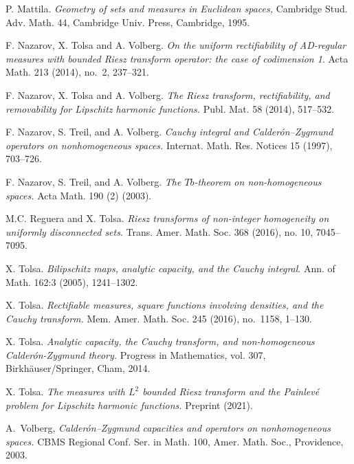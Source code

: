 \documentclass[11pt]{amsart}
\theoremstyle{definition}
\theoremstyle{remark}
\numberwithin{equation}{section}
\begin{document}
\begin{thebibliography}{NTWV}
 P. Mattila. {\em Geometry of sets and measures in
Euclidean spaces,} Cambridge Stud. Adv. Math. 44, Cambridge Univ.
Press, Cambridge, 1995.

 F. Nazarov, X. Tolsa and A. Volberg. \emph{On the uniform
  rectifiability of {AD}-regular measures with bounded {R}iesz transform
  operator: the case of codimension 1}. Acta Math. {213} (2014), no.~2,
  237--321. 

 F. Nazarov, X. Tolsa and A. Volberg. {\em The Riesz transform,
rectifiability, and removability for
 Lipschitz harmonic functions.}
Publ. Mat. 58 (2014), 517--532.

 F. Nazarov, S. Treil, and A. Volberg. {\em Cauchy integral and Calder\'on–Zygmund operators on nonhomogeneous spaces.} Internat. Math. Res. Notices 15 (1997), 703--726.

 F. Nazarov, S. Treil, and A. Volberg. {\em The $Tb$-theorem on non-homogeneous spaces.} Acta Math. 190 (2) (2003).


 M.C. Reguera and X. Tolsa. {\em Riesz transforms of non-integer homogeneity on uniformly disconnected sets}. Trans. Amer. Math. Soc. 368 (2016), no. 10, 7045--7095. 

 X. Tolsa. {\em Bilipschitz maps, analytic
capacity, and the Cauchy integral}. Ann. of Math. 162:3 (2005), 1241--1302.
 
 X. Tolsa. {\em Rectifiable measures, square functions involving densities, and the Cauchy transform.}
Mem. Amer. Math. Soc. {245} (2016), no.~1158, 1--130.

 X. Tolsa. {\em Analytic capacity, the Cauchy transform, and non-homogeneous Calder\'on-Zygmund theory.} Progress in Mathematics, vol. 307, Birkh\"auser/Springer, Cham, 2014.

 X. Tolsa. {\em The measures with $L^2$ bounded Riesz transform and the Painlev\'e problem for Lipschitz harmonic functions.} Preprint (2021).

 A.\ Volberg, {\em Calder\'on--Zygmund capacities and operators on nonhomogeneous spaces.}
CBMS Regional Conf. Ser. in Math. 100, Amer. Math. Soc., Providence, 2003.
\end{thebibliography}
\end{document}
